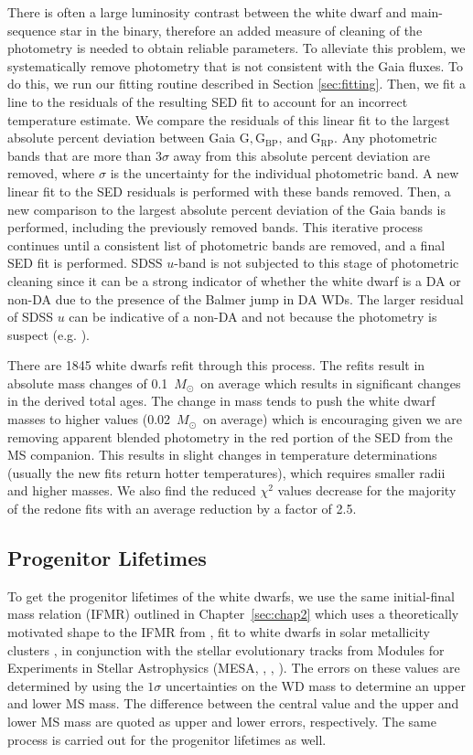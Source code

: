 \documentclass[twocolumn,linenumbers]{aastex631}
\newcommand{\msun}{$M_{\odot}$}
\begin{document}
There is often a large luminosity contrast between the white dwarf and main-sequence star in the binary, therefore an added measure of cleaning of the photometry is needed to obtain reliable parameters. To alleviate this problem, we systematically remove photometry that is not consistent with the Gaia fluxes. To do this, we run our fitting routine described in Section \ref{sec:fitting}. Then, we fit a line to the residuals of the resulting SED fit to account for an incorrect temperature estimate. We compare the residuals of this linear fit to the largest absolute percent deviation between Gaia  $\mathrm{G, G_{BP},\ and\ G_{RP}}$. Any photometric bands that are more than $3\sigma$ away from this absolute percent deviation are removed, where $\sigma$ is the uncertainty for the individual photometric band. A new linear fit to the SED residuals is performed with these bands removed. Then, a new comparison to the largest absolute percent deviation of the Gaia bands is performed, including the previously removed bands. This iterative process continues until a consistent list of photometric bands are removed, and a final SED fit is performed. SDSS $u$-band is not subjected to this stage of photometric cleaning since it can be a strong indicator of whether the white dwarf is a DA or non-DA due to the presence of the Balmer jump in DA WDs. The larger residual of SDSS $u$ can be indicative of a non-DA and not because the photometry is suspect (e.g. \citealt{2019ApJ...876...67B}). 

There are 1845 white dwarfs refit through this process. The refits result in absolute mass changes of 0.1~\msun\ on average which results in significant changes in the derived total ages. The change in mass tends to push the white dwarf masses to higher values (0.02~\msun\ on average) which is encouraging given we are removing apparent blended photometry in the red portion of the SED from the MS companion. This results in slight changes in temperature determinations (usually the new fits return hotter temperatures), which requires smaller radii and higher masses. We also find the reduced $\chi^{2}$ values decrease for the majority of the redone fits with an average reduction by a factor of 2.5.

\subsection{Progenitor Lifetimes}
To get the progenitor lifetimes of the white dwarfs, we use the same initial-final mass relation (IFMR) outlined in Chapter~\ref{sec:chap2} which uses a theoretically motivated shape to the IFMR from \citet{2016ApJ...823...46F}, fit to white dwarfs in solar metallicity clusters \citep{2015ApJ...807...90C,2016ApJ...818...84C}, in conjunction with the stellar evolutionary tracks from Modules for Experiments in Stellar Astrophysics (MESA, \citealt{2011ApJS..192....3P}, \citealt{2013ApJS..208....4P}, \citealt{2015ApJS..220...15P}). The errors on these values are determined by using the $1\sigma$ uncertainties on the WD mass to determine an upper and lower MS mass. The difference between the central value and the upper and lower MS mass are quoted as upper and lower errors, respectively. The same process is carried out for the progenitor lifetimes as well.
\end{document}
